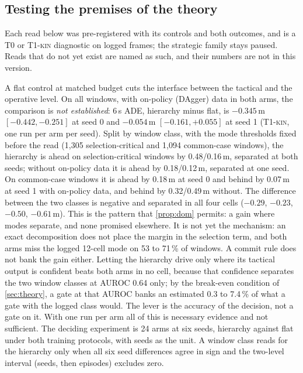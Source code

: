 \documentclass[10pt,twocolumn]{article}
\makeatletter
\theoremstyle{remark}
\newcommand{\tier}[1]{\textsc{\small #1}}
\renewcommand\paragraph{\@startsection{paragraph}{4}{\z@}{1.6ex \@plus .5ex \@minus .2ex}{-1em}{\normalfont\normalsize\bfseries}}
\makeatother
\begin{document}
\subsection{Testing the premises of the theory}\label{sec:premises}
Each read below was pre-registered with its controls and both outcomes, and is a \tier{T0} or \tier{T1-kin} diagnostic on logged
frames; the strategic family stays paused. Reads that do not yet exist are named as such, and their numbers are not in this version.

\paragraph{Hierarchy against a flat control (T2).} A flat control at matched budget cuts the interface between the tactical and the
operative level. On all windows, with on-policy (DAgger) data in both arms, the comparison is \emph{not established}: 6\,s ADE,
hierarchy minus flat, is $-0.345$\,m $[-0.442,-0.251]$ at seed 0 and $-0.054$\,m $[-0.161,+0.055]$ at seed 1 (\tier{T1-kin}, one run
per arm per seed). Split by window class, with the mode thresholds fixed before the read (1,305 selection-critical and 1,094
common-case windows), the hierarchy is ahead on selection-critical windows by 0.48/0.16\,m, separated at both seeds; without
on-policy data it is ahead by 0.18/0.12\,m, separated at one seed. On common-case windows it is ahead by 0.18\,m at seed 0 and behind
by 0.07\,m at seed 1 with on-policy data, and behind by 0.32/0.49\,m without. The difference between the two classes is negative and
separated in all four cells ($-0.29$, $-0.23$, $-0.50$, $-0.61$\,m). This is the pattern that \cref{prop:dom} permits: a gain where
modes separate, and none promised elsewhere. It is not yet the mechanism: an exact decomposition does not place the margin in the
selection term, and both arms miss the logged 12-cell mode on 53 to 71\,\% of windows. A commit rule does not bank the gain either.
Letting the hierarchy drive only where its tactical output is confident beats both arms in no cell, because that confidence
separates the two window classes at AUROC 0.64 only; by the break-even condition of \cref{sec:theory}, a gate at that AUROC banks an
estimated 0.3 to 7.4\,\% of what a gate with the logged class would. The lever is the accuracy of the decision, not a gate on it.
With one run per arm all of this is necessary evidence and not sufficient. The deciding experiment is 24 arms at six seeds, hierarchy against flat under both training protocols,
with seeds as the unit. A window class
reads for the hierarchy only when all six seed differences agree in sign and the two-level interval (seeds, then episodes) excludes zero.
\end{document}
